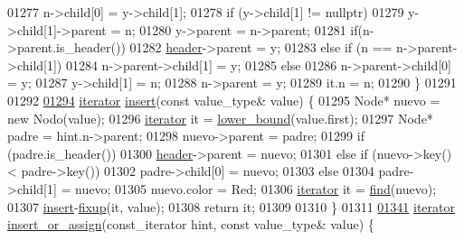 \begin{DoxyCode}
01277     n->child[0] = y->child[1];
01278     \textcolor{keywordflow}{if} (y->child[1] != \textcolor{keyword}{nullptr})
01279         y->child[1]->parent = n;
01280     y->parent = n->parent;
01281     \textcolor{keywordflow}{if}(n->parent.is\_header())
01282         \hyperlink{classaed2_1_1map_a92d93f905c8ad73fba18fdc7e8915cce_a92d93f905c8ad73fba18fdc7e8915cce}{header}->parent = y;
01283     \textcolor{keywordflow}{else} if (n == n->parent->child[1])
01284         n->parent->child[1] = y;
01285     \textcolor{keywordflow}{else}
01286         n->parent->child[0] = y;
01287     y->child[1] = n;
01288     n->parent = y;
01289     it.n = n;
01290 \}
01291     
01292 
\hypertarget{map2_8h_source_l01294}{}\hyperlink{classaed2_1_1map_a60aacba06b1579630b3c8e996cf248c8_a60aacba06b1579630b3c8e996cf248c8}{01294}     \hyperlink{classaed2_1_1iterator}{iterator} \hyperlink{classaed2_1_1map_a60aacba06b1579630b3c8e996cf248c8_a60aacba06b1579630b3c8e996cf248c8}{insert}(\textcolor{keyword}{const} value\_type& value) \{
01295         Node* nuevo = \textcolor{keyword}{new} Nodo(value);
01296         \hyperlink{classaed2_1_1iterator}{iterator} it = \hyperlink{classaed2_1_1map_a3399d36fdd5a880b494f3a5795d3f18f_a3399d36fdd5a880b494f3a5795d3f18f}{lower_bound}(value.first);
01297         Node* padre = hint.n->parent;
01298         nuevo->parent = padre;
01299         \textcolor{keywordflow}{if} (padre.is\_header())
01300             \hyperlink{classaed2_1_1map_a92d93f905c8ad73fba18fdc7e8915cce_a92d93f905c8ad73fba18fdc7e8915cce}{header}->parent = nuevo;
01301         \textcolor{keywordflow}{else} if (nuevo->key() < padre->key())
01302             padre->child[0] = nuevo;
01303         \textcolor{keywordflow}{else}
01304             padre->child[1] = nuevo;
01305         nuevo.color = Red;
01306         \hyperlink{classaed2_1_1iterator}{iterator} it = \hyperlink{classaed2_1_1map_afd0fc1a8234888e61e0e615de7e245b8_afd0fc1a8234888e61e0e615de7e245b8}{find}(nuevo);
01307         \hyperlink{classaed2_1_1map_a60aacba06b1579630b3c8e996cf248c8_a60aacba06b1579630b3c8e996cf248c8}{insert}-\hyperlink{classaed2_1_1map_a905aa80287bf2a97cca5a9dda1c8ab12_a905aa80287bf2a97cca5a9dda1c8ab12}{fixup}(it, value);
01308         \textcolor{keywordflow}{return} it;
01309 
01310     \}
01311 
\hypertarget{map2_8h_source_l01341}{}\hyperlink{classaed2_1_1map_a2ef6723c183916276b0afc4a4c721475_a2ef6723c183916276b0afc4a4c721475}{01341}     \hyperlink{classaed2_1_1iterator}{iterator} \hyperlink{classaed2_1_1map_a2ef6723c183916276b0afc4a4c721475_a2ef6723c183916276b0afc4a4c721475}{insert_or_assign}(const\_iterator hint, \textcolor{keyword}{const} value\_type& value) \{

\end{DoxyCode}
